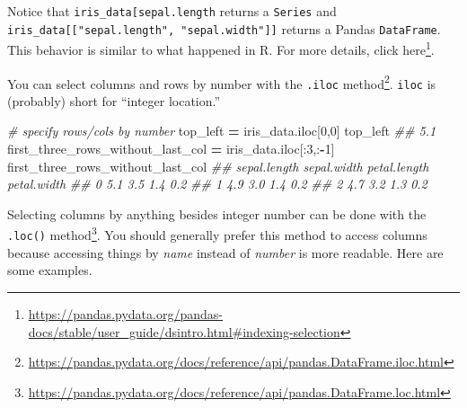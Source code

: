 \documentclass[
  12pt,
  krantz2]{krantz}
\makeatletter
\newenvironment{Shaded}{\begin{snugshade}}{\end{snugshade}}
\newcommand{\CommentTok}[1]{\textcolor[rgb]{0.37,0.37,0.37}{\textit{#1}}}
\newcommand{\DecValTok}[1]{\textcolor[rgb]{0.06,0.06,0.06}{#1}}
\newcommand{\NormalTok}[1]{#1}
\newcommand{\OperatorTok}[1]{\textcolor[rgb]{0.43,0.43,0.43}{\textbf{#1}}}
\renewcommand{\href}[2]{#2\footnote{\url{#1}}}
\newenvironment{kframe}{%
\medskip{}
\setlength{\fboxsep}{.8em}
 \def\at@end@of@kframe{}%
 \ifinner\ifhmode%
  \def\at@end@of@kframe{\end{minipage}}%
  \begin{minipage}{\columnwidth}%
 \fi\fi%
 \def\FrameCommand##1{\hskip\@totalleftmargin \hskip-\fboxsep
 \colorbox{shadecolor}{##1}\hskip-\fboxsep
     \hskip-\linewidth \hskip-\@totalleftmargin \hskip\columnwidth}%
 \MakeFramed {\advance\hsize-\width
   \@totalleftmargin\z@ \linewidth\hsize
   \@setminipage}}%
 {\par\unskip\endMakeFramed%
 \at@end@of@kframe}
\renewenvironment{Shaded}{\begin{kframe}}{\end{kframe}}
\makeatother
\begin{document}
\begin{rmd-details}
Notice that \texttt{iris\_data{[}\textquotesingle{}sepal.length\textquotesingle{}{]}} returns a \texttt{Series} and \texttt{iris\_data{[}{[}"sepal.length",\ "sepal.width"{]}{]}} returns a Pandas \texttt{DataFrame}. This behavior is similar to what happened in R. For more details, click \href{https://pandas.pydata.org/pandas-docs/stable/user_guide/dsintro.html\#indexing-selection}{here}.

\end{rmd-details}

You can select columns and rows by number with the \href{https://pandas.pydata.org/docs/reference/api/pandas.DataFrame.iloc.html}{\texttt{.iloc} method}. \texttt{iloc} is (probably) short for ``integer location.''

\begin{Shaded}
\begin{Highlighting}[]
\CommentTok{\# specify rows/cols by number}
\NormalTok{top\_left }\OperatorTok{=}\NormalTok{ iris\_data.iloc[}\DecValTok{0}\NormalTok{,}\DecValTok{0}\NormalTok{]}
\NormalTok{top\_left}
\CommentTok{\#\# 5.1}
\NormalTok{first\_three\_rows\_without\_last\_col }\OperatorTok{=}\NormalTok{ iris\_data.iloc[:}\DecValTok{3}\NormalTok{,:}\OperatorTok{{-}}\DecValTok{1}\NormalTok{]}
\NormalTok{first\_three\_rows\_without\_last\_col}
\CommentTok{\#\#    sepal.length  sepal.width  petal.length  petal.width}
\CommentTok{\#\# 0           5.1          3.5           1.4          0.2}
\CommentTok{\#\# 1           4.9          3.0           1.4          0.2}
\CommentTok{\#\# 2           4.7          3.2           1.3          0.2}
\end{Highlighting}
\end{Shaded}

Selecting columns by anything besides integer number can be done with the \href{https://pandas.pydata.org/docs/reference/api/pandas.DataFrame.loc.html}{\texttt{.loc()} method}. You should generally prefer this method to access columns because accessing things by \emph{name} instead of \emph{number} is more readable. Here are some examples.
\end{document}
